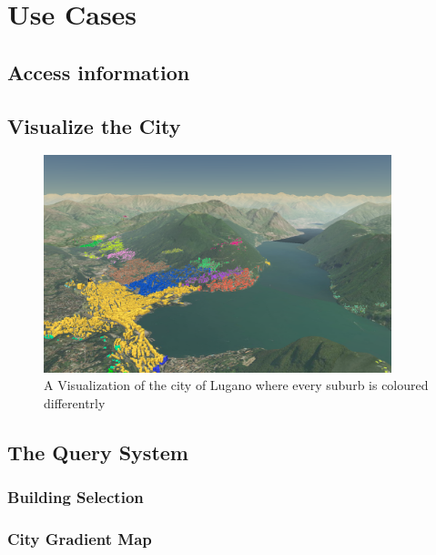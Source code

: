 \section{Use Cases} \label{useCases}
\subsection{Access information}
\subsection{Visualize the City}
\begin{figure} [H]
\centering
\includegraphics[width=0.9\textwidth]{chapter4/images/application_bySuburb}
\caption{A Visualization of the city of Lugano where every suburb is coloured differentrly}
\label{fig:application_bySuburb}
\end{figure}
\subsection{The Query System}
\subsubsection{Building Selection}
\subsubsection{City Gradient Map}
